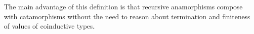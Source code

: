 \documentclass[a4paper,anonymous, UKenglish,cleveref, autoref, thm-restate]{lipics-v2021}
\newcommand{\mpav}[1]{\textcolor{red}{\textsc{Marco}: #1}}
\newcommand{\dcas}[1]{\textcolor{ForestGreen}{\textsc{David}: #1}}
\begin{document}
\noindent
The main advantage of this definition is that recursive anamorphisms
compose with catamorphisms without the need to reason about termination
and finiteness of values of coinductive types.




\end{document}
